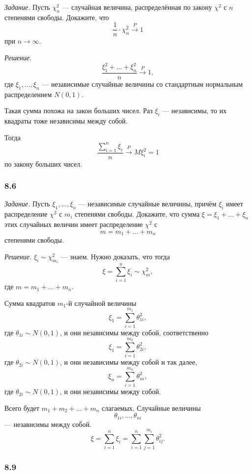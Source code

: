 \textit{Задание.}
Пусть $ \chi_n^2$ --- случайная величина,
распределённая по закону $ \chi^2$ с $n$ степенями свободы.
Докажите, что
$$ \frac{1}{n} \cdot \chi_n^2 \overset{P}{ \rightarrow}
  1$$
при $n \to \infty $.

\textit{Решение.}
$$ \frac{ \xi_1^2 + \dotsc + \xi_n^2}{n} \overset{P}{ \rightarrow }
  1,$$
где $ \xi_1, \dotsc, \xi_n$ ---
независимые случайные величины со стандартным нормальным распределением $N \left( 0, 1 \right) $.

Такая сумма похожа на закон больших чисел.
Раз $ \xi_i$ --- независимы, то их квадраты тоже независимы между собой.

Тогда
$$ \frac{ \sum \limits_{i = 1}^n  \xi_i}{n} \overset{P}{ \rightarrow }
  M \xi_i^2 =
  1$$
по закону больших чисел.

\subsubsection*{8.6}

\textit{Задание.}
Пусть $ \xi_1, \dotsc, \xi_n$ --- независимые случайные величины,
причём $ \xi_i$ имеет распределение $ \chi^2$ с $m_i$ степенями свободы.
Докажите,
что сумма $ \xi = \xi_1 + \dotsc + \xi_n$ этих случайных величин имеет распределение $ \chi^2$ с
$$m =
  m_1 + \dotsc + m_n$$
степенями свободы.

\textit{Решение.} $ \xi_i \sim \chi_{m_i}^2$ --- знаем.
Нужно доказать, что тогда
$$ \xi =
  \sum \limits_{i = 1}^n \xi_i \sim
  \chi_m^2,$$
где $m = m_1 + \dotsc + m_n$.

Сумма квадратов $m_1$-й случайной величины
$$ \xi_1 =
  \sum \limits_{i = 1}^{m_1} \theta_{1i}^2,$$
где $ \theta_{1i} \sim N \left( 0, 1 \right)$, и они независимы между собой, соответственно
$$ \xi_1 =
  \sum \limits_{i = 1}^{m_2} \theta_{2i}^2,$$
где $ \theta_{2i} \sim N \left( 0, 1 \right) $, и они независимы между собой и так далее,
$$ \xi_n =
  \sum \limits_{i = 1}^{m_n} \theta_{ni}^2,$$
где $ \theta_{2i} \sim N \left( 0, 1 \right) $, и они независимы между собой.

Всего будет $m_1 + m_2 + \dotsc + m_n$ слагаемых.
Случайные величины
$$ \theta_{1i}, \dotsc, \theta_{ni}$$
--- независимы между собой.
$$ \xi =
  \sum \limits_{i = 1}^n  \xi_i =
  \sum \limits_{i = 1}^n \sum \limits_{j = 1}^{m_i} \theta_{ij}^2.$$

\subsubsection*{8.9}

